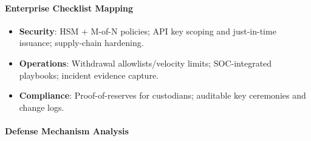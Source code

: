 \paragraph{Enterprise Checklist Mapping}
\begin{itemize}
    \item \textbf{Security}: HSM + M-of-N policies; API key scoping and just-in-time issuance; supply-chain hardening.
    \item \textbf{Operations}: Withdrawal allowlists/velocity limits; SOC-integrated playbooks; incident evidence capture.
    \item \textbf{Compliance}: Proof-of-reserves for custodians; auditable key ceremonies and change logs.
\end{itemize}

\paragraph{Defense Mechanism Analysis}

